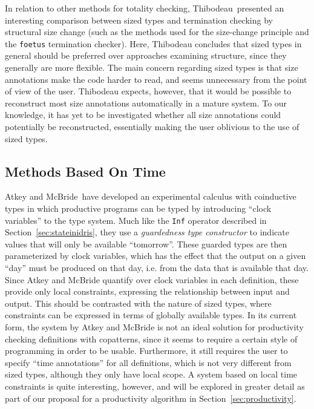 In relation to other methods for totality checking, Thibodeau\,\citep{Thibodeau11} presented an interesting comparison between sized types and termination checking by structural size change (such as the methods used for the size-change principle and the \texttt{foetus} termination checker). Here, Thibodeau concludes that sized types in general should be preferred over approaches examining structure, since they generally are more flexible. The main concern regarding sized types is that size annotations make the code harder to read, and seems unnecessary from the point of view of the user. Thibodeau expects, however, that it would be possible to reconstruct most size annotations automatically in a mature system. To our knowledge, it has yet to be investigated whether all size annotations could potentially be reconstructed, essentially making the user oblivious to the use of sized types.

\subsection{Methods Based On Time}
Atkey and McBride\,\citep{AtkeyMcBride13} have developed an experimental calculus with coinductive types in which productive programs can be typed by introducing ``clock variables'' to the type system. Much like the \texttt{Inf} operator described in Section~\ref{sec:stateinidris}, they use a \emph{guardedness type constructor} to indicate values that will only be available ``tomorrow''. These guarded types are then parameterized by clock variables, which has the effect that the output on a given ``day'' must be produced on that day, i.e. from the data that is available that day. Since Atkey and McBride quantify over clock variables in each definition, these provide only local constraints, expressing the relationship between input and output. This should be contrasted with the nature of sized types, where constraints can be expressed in terms of globally available types. In its current form, the system by Atkey and McBride is not an ideal solution for productivity checking definitions with copatterns, since it seems to require a certain style of programming in order to be usable. Furthermore, it still requires the user to specify ``time annotations'' for all definitions, which is not very different from sized types, although they only have local scope. A system based on local time constraints is quite interesting, however, and will be explored in greater detail as part of our proposal for a productivity algorithm in Section~\ref{sec:productivity}.

